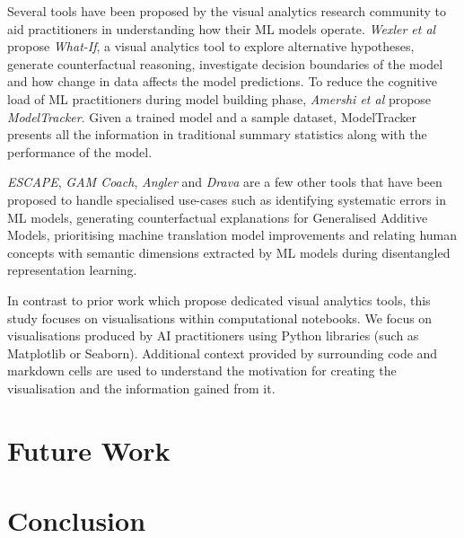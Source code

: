 Several tools have been proposed by the visual analytics research
community to aid practitioners in understanding how their ML models
operate. \emph{Wexler et al} propose \textit{What-If}, a visual
analytics tool to explore alternative hypotheses, generate
counterfactual reasoning, investigate decision boundaries of the model
and how change in data affects the model predictions. To reduce the
cognitive load of ML practitioners during model building phase,
\emph{Amershi et al} propose \textit{ModelTracker}. Given a trained
model and a sample dataset, ModelTracker presents all the information
in traditional summary statistics along with the performance of the
model.

\textit{ESCAPE}, \textit{GAM Coach}, \textit{Angler} and
\textit{Drava} are a few other tools that have been proposed to handle
specialised use-cases such as identifying systematic errors in ML
models, generating counterfactual explanations for Generalised
Additive Models, prioritising machine translation model improvements
and relating human concepts with semantic dimensions extracted by ML
models during disentangled representation learning\cite{ahn2023escape,
  wang2023gam, robertson2023angler, wang2023drava}.

In contrast to prior work which propose dedicated visual analytics
tools, this study focuses on visualisations within computational
notebooks. We focus on visualisations produced by AI practitioners
using Python libraries (such as Matplotlib or Seaborn). Additional
context provided by surrounding code and markdown cells are used to
understand the motivation for creating the visualisation and the
information gained from it.

\section{Future Work}


\section{Conclusion}




